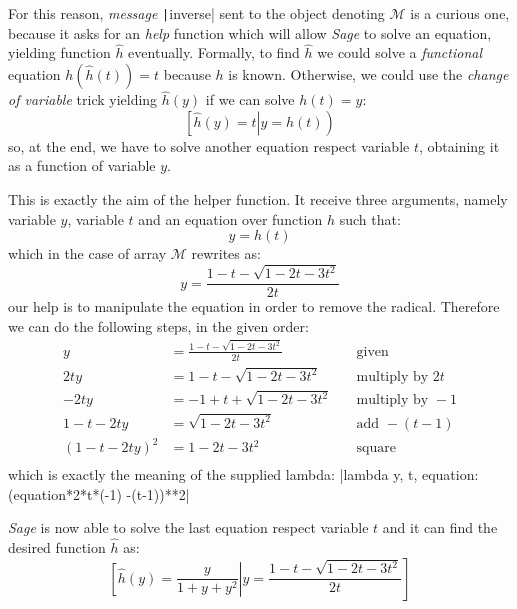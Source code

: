 For this reason, \emph{message} \texttt|inverse| sent to the object
denoting $\mathcal{M}$ is a curious one, because it asks for an \emph{help}
function which will allow \emph{Sage} to solve an equation, yielding function
$\hat{h}$ eventually. Formally, to find $\hat{h}$ we could solve a
\emph{functional} equation $h(\hat{h}(t))=t$ because $h$ is known.  Otherwise,
we could use the \emph{change of variable} trick yielding $\hat{h}(y)$ if we
can solve $h(t)=y$: 
\begin{displaymath}
    \left.\left[\hat{h}(y)=t\right|y=h(t)\right)
\end{displaymath}
so, at the end, we have to solve another equation respect 
variable $t$, obtaining it as a function of variable $y$.

This is exactly the aim of the helper function. It receive three arguments, 
namely variable $y$, variable $t$ and an equation over function $h$ such that:
\begin{displaymath}
    y=h(t)
\end{displaymath}
which in the case of array $\mathcal{M}$ rewrites as:
\begin{displaymath}
    y=\frac{1-t-\sqrt{1-2t-3t^{2}}}{2t}
\end{displaymath}
our help is to manipulate the equation in order to remove the radical. Therefore
we can do the following steps, in the given order:
\begin{displaymath}
    \begin{split}
        y&=\frac{1-t-\sqrt{1-2t-3t^{2}}}{2t} &\quad\text{given}\\
        2ty &=1-t-\sqrt{1-2t-3t^{2}} &\quad\text{multiply by } 2t\\
        -2ty &=-1+t+\sqrt{1-2t-3t^{2}} &\quad\text{multiply by } -1\\
        1-t-2ty &=\sqrt{1-2t-3t^{2}} &\quad\text{add } -(t-1)\\
        \left(1-t-2ty\right)^{2} &=1-2t-3t^{2} &\quad\text{square}\\
    \end{split}
\end{displaymath}
which is exactly the meaning of the supplied lambda: |lambda y, t,
equation: (equation*2*t*(-1) -(t-1))**2| 

\emph{Sage} is now able to solve the last equation respect variable $t$ and it
can find the desired function $\hat{h}$ as:
\begin{displaymath}
    \left.\left[\hat{h}(y)=\frac{y}{1+y+y^{2}}\right|
        y=\frac{1-t-\sqrt{1-2t-3t^{2}}}{2t} \right]
\end{displaymath}

